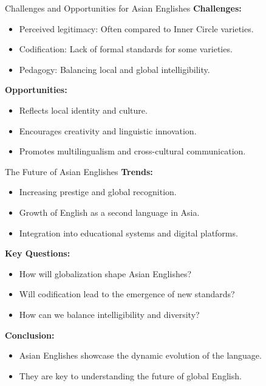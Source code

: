 \documentclass{beamer}
\begin{document}
\begin{frame}{Challenges and Opportunities for Asian Englishes}
\textbf{Challenges:}
\begin{itemize}
    \item Perceived legitimacy: Often compared to Inner Circle varieties.
    \item Codification: Lack of formal standards for some varieties.
    \item Pedagogy: Balancing local and global intelligibility.
\end{itemize}

\textbf{Opportunities:}
\begin{itemize}
    \item Reflects local identity and culture.
    \item Encourages creativity and linguistic innovation.
    \item Promotes multilingualism and cross-cultural communication.
\end{itemize}
\end{frame}

\begin{frame}{The Future of Asian Englishes}
\textbf{Trends:}
\begin{itemize}
    \item Increasing prestige and global recognition.
    \item Growth of English as a second language in Asia.
    \item Integration into educational systems and digital platforms.
\end{itemize}

\textbf{Key Questions:}
\begin{itemize}
    \item How will globalization shape Asian Englishes?
    \item Will codification lead to the emergence of new standards?
    \item How can we balance intelligibility and diversity?
\end{itemize}

\textbf{Conclusion:}
\begin{itemize}
    \item Asian Englishes showcase the dynamic evolution of the language.
    \item They are key to understanding the future of global English.
\end{itemize}
\end{frame}
\end{document}
